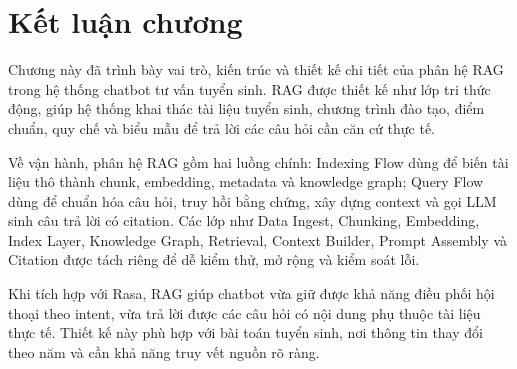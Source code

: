\section{Kết luận chương}

Chương này đã trình bày vai trò, kiến trúc và thiết kế chi tiết của phân hệ RAG trong hệ thống chatbot tư vấn tuyển sinh. RAG được thiết kế như lớp tri thức động, giúp hệ thống khai thác tài liệu tuyển sinh, chương trình đào tạo, điểm chuẩn, quy chế và biểu mẫu để trả lời các câu hỏi cần căn cứ thực tế.

Về vận hành, phân hệ RAG gồm hai luồng chính: Indexing Flow dùng để biến tài liệu thô thành chunk, embedding, metadata và knowledge graph; Query Flow dùng để chuẩn hóa câu hỏi, truy hồi bằng chứng, xây dựng context và gọi LLM sinh câu trả lời có citation. Các lớp như Data Ingest, Chunking, Embedding, Index Layer, Knowledge Graph, Retrieval, Context Builder, Prompt Assembly và Citation được tách riêng để dễ kiểm thử, mở rộng và kiểm soát lỗi.

Khi tích hợp với Rasa, RAG giúp chatbot vừa giữ được khả năng điều phối hội thoại theo intent, vừa trả lời được các câu hỏi có nội dung phụ thuộc tài liệu thực tế. Thiết kế này phù hợp với bài toán tuyển sinh, nơi thông tin thay đổi theo năm và cần khả năng truy vết nguồn rõ ràng.
